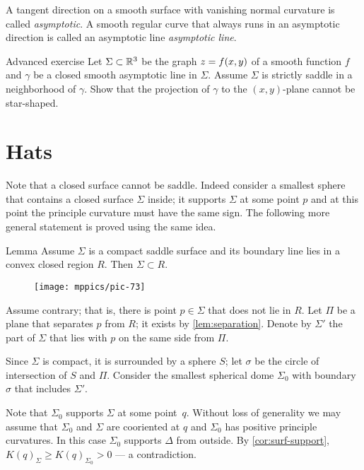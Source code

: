 A tangent direction on a smooth surface with vanishing normal curvature is called \emph{asymptotic}.
A smooth regular curve that always runs in an asymptotic direction is called an asymptotic line
\emph{asymptotic line}.\label{page:asymptotic line}

\begin{thm}{Advanced exercise}
Let $\Sigma\subset \mathbb{R}^3$ be the graph $z\z=f(x,y)$
of a smooth function $f$ 
and $\gamma$ be a closed smooth asymptotic line in $\Sigma$.
Assume $\Sigma$ is strictly saddle in a neighborhood of $\gamma$.
Show that the projection of $\gamma$ to the $(x, y)$-plane cannot be star-shaped.
\end{thm}

\section*{Hats}

Note that a closed surface cannot be saddle.
Indeed consider a smallest sphere that contains a closed surface $\Sigma$ inside;
it supports $\Sigma$ at some point $p$ and at this point the principle curvature must have the same sign.
The following more general statement  is proved using the same idea.

\begin{thm}{Lemma}\label{lem:convex-saddle}
Assume $\Sigma$ is a compact saddle surface and its boundary line lies in a convex closed region $R$.
Then $\Sigma\subset R$.
\end{thm}

\begin{wrapfigure}{o}{50 mm}
\vskip-0mm
\centering
\texttt{[image: mppics/pic-73]}
\vskip0mm
\end{wrapfigure}

Assume contrary; that is, there is point $p\in \Sigma$ that does not lie in $R$.
Let $\Pi$ be a plane that separates $p$ from $R$; it exists by \ref{lem:separation}.
Denote by $\Sigma'$ the part of $\Sigma$ that lies with $p$ on the same side from $\Pi$.

Since $\Sigma$ is compact, it is surrounded by a sphere $S$;
let $\sigma$ be the circle of intersection of $S$ and $\Pi$.
Consider the smallest spherical dome $\Sigma_0$ with boundary $\sigma$ that includes $\Sigma'$.

Note that $\Sigma_0$ supports $\Sigma$ at some point~$q$.
Without loss of generality we may assume that $\Sigma_0$ and $\Sigma$ are cooriented at $q$ and $\Sigma_0$ has positive principle curvatures.
In this case $\Sigma_0$ supports $\Delta$ from outside.
By \ref{cor:surf-support}, $K(q)_\Sigma\ge K(q)_{\Sigma_0}>0$ --- a contradiction.
\qeds

